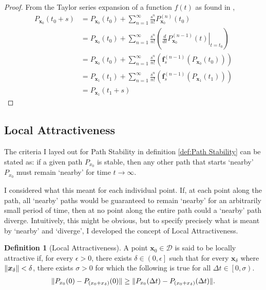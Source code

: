 \documentclass{article}
\newcommand{\B}[1]{\boldsymbol{#1}}
\DeclarePairedDelimiter\norm{\lVert}{\rVert}%
\theoremstyle{definition}
\newtheorem{definition}{Definition}[section]
\theoremstyle{remark}
\begin{document}
\begin{proof}
  From the Taylor series expansion of a function $f(t)$ as found in \cite{AdvancedCalculus},
  \begin{align}
    P_{\B{x}_0}(t_0 + s) &= P_{\B{x}_0}(t_0) + \sum_{n=1}^{\infty} \frac{s^n}{n!} P_{\B{x}_0}^{(n)}(t_0) \nonumber\\
    & = P_{\B{x}_0}(t_0) + \sum_{n=1}^{\infty} \frac{s^n}{n!} \left( \left. \frac{d}{dt}P_{\B{x}_0}^{(n-1)}(t) \right\rvert_{t=t_0} \right) \nonumber\\
    & = P_{\B{x}_0}(t_0) + \sum_{n=1}^{\infty} \frac{s^n}{n!} \left( \B{f}_s^{(n-1)} \left( P_{\B{x}_0}(t_0) \right) \right) \nonumber\\
    & = P_{\B{x}_1}(t_1) + \sum_{n=1}^{\infty} \frac{s^n}{n!} \left( \B{f}_s^{(n-1)} \left( P_{\B{x}_1}(t_1) \right) \right) \nonumber\\
    & = P_{\B{x}_1}(t_1 + s) \nonumber
  \end{align}
\end{proof}

\subsection{Local Attractiveness}

The criteria I layed out for Path Stability in definition \ref{def:Path Stability} can 
be stated as: if a given path $P_{x_0}$ is stable, then any other path that starts `nearby'
$P_{x_0}$ must remain `nearby' for time $t \to \infty$.

I considered what this meant for each individual point. If, at each point along the path,
all `nearby' paths would be guaranteed to remain `nearby' for an arbitrarily small period of time,
then at no point along the entire path could a `nearby' path diverge. Intuitively, this might
be obvious, but to specify precisely what is meant by `nearby' and `diverge', I developed the concept 
of Local Attractiveness.  

\begin{definition}[Local Attractiveness]
  \label{def:Local Path Attractiveness}
  A point $\B{x}_0 \in \mathcal{D}$ is said to be locally attractive if,
  for every $\epsilon > 0$, there exists $\delta \in \left(0, \epsilon\right]$ such that
  for every $\B{x}_\delta$ where $\norm{\B{x}_\delta} < \delta$,
  there exists $\sigma > 0$ for which the following is true
  for all $\Delta t \in \left[0, \sigma \right)$.
  \begin{align}
  \norm{P_{x_0}(0) - P_{\left(x_0 + x_\delta\right)}(0)} \ge \norm{P_{x_0}(\Delta t) - P_{\left(x_0 + x_\delta\right)}(\Delta t)}.
  \end{align}  
\end{definition}
\end{document}
